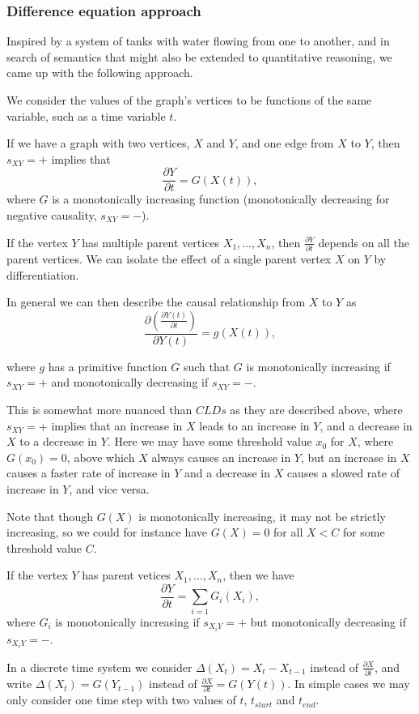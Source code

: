 \documentclass[]{article}
\begin{document}
\subsubsection{Difference equation approach}

Inspired by a system of tanks with water flowing from one to another,
and in search of semantics that might also be extended to quantitative
reasoning, we came up with the following approach.

We consider the values of the graph's vertices to be functions of the same
variable, such as a time variable $t$.

If we have a graph with two vertices, $X$ and $Y$, and one edge from $X$
to $Y$, then $s_{XY}=+$ implies that
\[\frac{\partial Y}{\partial t} = G(X(t)),\]
where $G$ is a monotonically increasing function (monotonically decreasing for negative
causality, $s_{XY}=-$).

If the vertex $Y$ has multiple parent vertices $X_1,\ldots,X_n$, then
$\frac{\partial Y}{\partial t}$ depends on all the parent vertices. We can
isolate the effect of a single parent vertex
 $X$ on $Y$ by differentiation.

In general we can then describe the causal relationship from $X$ to
$Y$ as
\[\frac{\partial\left( \frac{\partial Y(t)}{\partial t} \right)}{\partial Y(t)} =
  g(X(t)),\]

where $g$ has a primitive function $G$ such that $G$ is monotonically
increasing if $s_{XY}=+$ and monotonically decreasing if $s_{XY}= -$.

This is somewhat more nuanced than $CLDs$ as they are described above,
where $s_{XY}=+$ implies that an increase in $X$ leads to an increase
in $Y$, and a decrease in $X$ to a decrease in $Y$.
%
Here we may have some threshold value $x_0$ for $X$, where $G(x_0) = 0$,
above which $X$ always causes an increase in $Y$, but an increase in $X$
causes a faster rate of increase in $Y$ and a decrease in $X$ causes a
slowed rate of increase in $Y$, and vice versa.

Note that though $G(X)$ is monotonically increasing, it may not be strictly
increasing, so we could for instance have $G(X) = 0$ for all $X < C$
for some threshold value $C$.

If the vertex $Y$ has parent vetices $X_1,\ldots,X_n$, then we have
\[\frac{\partial Y}{\partial t} = \sum_{i=1}G_i(X_i),\]
where $G_i$ is monotonically increasing if $s_{X_iY}=+$ but monotonically
decreasing if $s_{X_iY}=-$.

In a discrete time system we consider $\Delta(X_t) = X_t - X_{t-1}$
instead of $\frac{\partial X}{\partial t}$, and write
$\Delta(X_t) = G(Y_{t-1})$ instead of
$\frac{\partial X}{\partial t} = G(Y(t))$.
%
In simple cases we may only consider one time step with two values of
$t$, $t_{start}$ and $t_{end}$.
\end{document}
